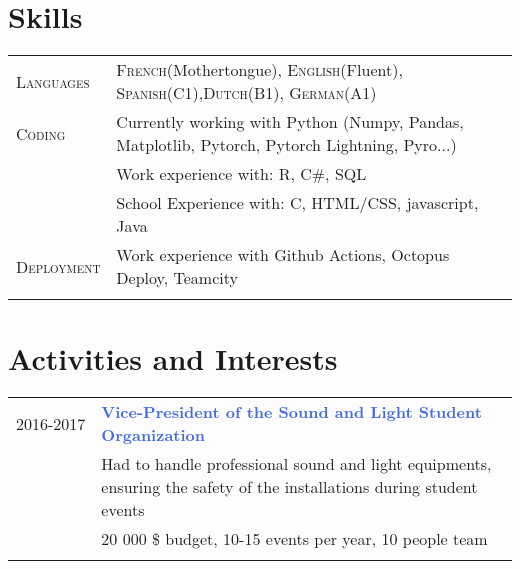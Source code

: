 \documentclass[a4paper,10pt]{article} %
\begin{document}
{\section{Skills}
\begin{tabular}{p{2cm}p{15cm}}
	\textsc{Languages}    & \textsc{French}(Mothertongue), \textsc{English}(Fluent),   \textsc{Spanish}(C1),\textsc{Dutch}(B1), \textsc{German}(A1) \\
	\textsc{Coding} & Currently working with Python (Numpy, Pandas, Matplotlib, Pytorch, Pytorch Lightning, Pyro...)	\\
		 		   		 & Work experience with: R, C\#, SQL                                      \\
	                     & School Experience with: C,  HTML/CSS, javascript, Java                     \\
	\textsc{Deployment} & Work experience with Github Actions, Octopus Deploy, Teamcity\\

	\\
\end{tabular}



\section{Activities and Interests}
\begin{tabular}{p{2cm}p{15cm}}

	\textsc{2016}-2017 & \textcolor{royalblue}{\textbf{Vice-President of the Sound and Light Student Organization}}                                                            \\
	                   & Had to handle professional sound and light equipments, ensuring the safety of the installations during student events                                 \\
	                   & \textcolor{pinegreen}{20 000 \$ budget, 10-15 events per year, 10 people team}                                                                        \\
	\\


\end{tabular}}
\end{document}
